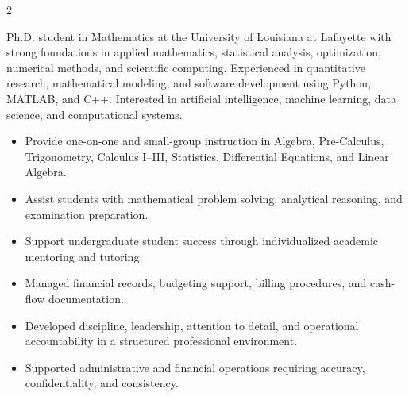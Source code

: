 \documentclass[10pt,a4paper,ragged2e,withhyper]{altacv}
\begin{document}



\makecvheader


\begin{paracol}{2}


Ph.D. student in Mathematics at the University of Louisiana at Lafayette with strong foundations in applied mathematics, statistical analysis, optimization, numerical methods, and scientific computing. Experienced in quantitative research, mathematical modeling, and software development using Python, MATLAB, and C++. Interested in artificial intelligence, machine learning, data science, and computational systems.


\begin{itemize}
\item Provide one-on-one and small-group instruction in Algebra, Pre-Calculus, Trigonometry, Calculus I--III, Statistics, Differential Equations, and Linear Algebra.
\item Assist students with mathematical problem solving, analytical reasoning, and examination preparation.
\item Support undergraduate student success through individualized academic mentoring and tutoring.
\end{itemize}

\divider

\begin{itemize}
\item Managed financial records, budgeting support, billing procedures, and cash-flow documentation.
\item Developed discipline, leadership, attention to detail, and operational accountability in a structured professional environment.
\item Supported administrative and financial operations requiring accuracy, confidentiality, and consistency.
\end{itemize}


\end{paracol}
\end{document}
